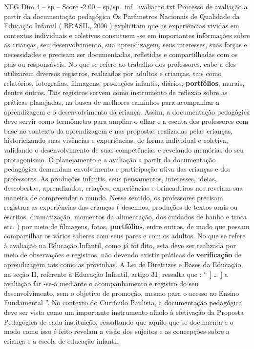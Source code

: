 \begin{textsample}{NEG Dim 4 – sp – Score -2.00 – sp/sp\_inf\_avaliacao.txt}  \label{ex:f4_neg_032}
Processo de avaliação a partir da documentação pedagógica Os Parâmetros Nacionais de Qualidade da Educação Infantil ( BRASIL, 2006 ) explicitam que as experiências vividas em contextos individuais e coletivos constituem -se em importantes informações sobre as crianças, seu desenvolvimento, sua aprendizagem, seus interesses, suas forças e necessidades e precisam ser documentadas, refletidas e compartilhadas com os pais ou responsáveis.
No que se refere ao trabalho dos professores, cabe a eles utilizarem diversos registros, realizados por adultos e crianças, tais como relatórios, fotografias, filmagens, produções infantis, diários, \textbf{portfólios}, murais, dentre outros.
Tais registros servem como instrumento de reflexão sobre as práticas planejadas, na busca de melhores caminhos para acompanhar a aprendizagem e o desenvolvimento da criança.
Assim, a documentação pedagógica deve servir como termômetro para ampliar o olhar e a escuta dos professores com base no contexto da aprendizagem e nas propostas realizadas pelas crianças, historicizando suas vivências e experiências, de forma individual e coletiva, validando o desenvolvimento de suas competências e revelando memórias do seu protagonismo.
O planejamento e a avaliação a partir da documentação pedagógica demandam envolvimento e participação ativa das crianças e dos professores.
As produções infantis, seus pensamentos, interesses, ideias, descobertas, aprendizados, criações, experiências e brincadeiras nos revelam sua maneira de compreender o mundo.
Nesse sentido, os professores precisam registrar as experiências das crianças ( desenhos, produções de textos orais ou escritos, dramatização, momentos da alimentação, dos cuidados de banho e troca etc. ) por meio de filmagens, fotos, \textbf{portfólios}, entre outros, de modo que possam compartilhar os vários saberes com seus pares e com os adultos.
No que se refere à avaliação na Educação Infantil, como já foi dito, esta deve ser realizada por meio de observações e registros, não devendo existir práticas de \textbf{verificação} de aprendizagem tais como as provinhas.
A Lei de Diretrizes e Bases da Educação, na seção II, referente à Educação Infantil, artigo 31, ressalta que : “ [ … ] a avaliação far -se-á mediante o acompanhamento e registro do seu desenvolvimento, sem o objetivo de promoção, mesmo para o acesso ao Ensino Fundamental ”.
No contexto do Currículo Paulista, a documentação pedagógica deve ser vista como um importante instrumento aliado à efetivação da Proposta Pedagógica de cada instituição, ressaltando que aquilo que se documenta e o modo como isso é feito revelam a visão dos sujeitos e as concepções sobre a criança e a escola de educação infantil.

\end{textsample}
